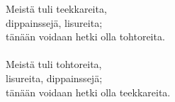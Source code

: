 
            Meistä tuli teekkareita, \\
            dippainssejä, lisureita; \\
            tänään voidaan hetki olla tohtoreita. \\
\hspace{10mm} \\
            Meistä tuli tohtoreita, \\
            lisureita, dippainssejä; \\
            tänään voidaan hetki olla teekkareita. \\
